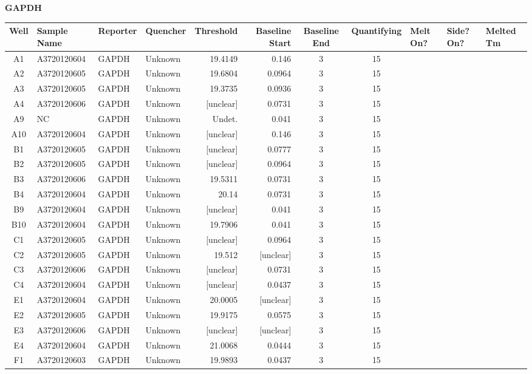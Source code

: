 \documentclass[UTF8,10pt,a4paper,fontset=fandol]{ctexart}
\begin{document}
\small
\begin{center}
\textbf{GAPDH}

\begin{tabular}{|c|p{2.0cm}|p{1.0cm}|p{1.0cm}|r|r|c|c|p{1.2cm}|p{1.0cm}|p{1.2cm}|}
\hline
\textbf{Well} & \textbf{Sample Name} & \textbf{Reporter} &
\textbf{Quencher} & \textbf{Threshold} & \textbf{Baseline Start} &
\textbf{Baseline End} & \textbf{Quantifying} & \textbf{Melt On?} &
\textbf{Side? On?} & \textbf{Melted Tm} \\
\hline
A1  & A3720120604 & GAPDH & Unknown & 19.4149 & 0.146  & 3  & 15 & & & \\
A2  & A3720120605 & GAPDH & Unknown & 19.6804 & 0.0964 & 3  & 15 & & & \\
A3  & A3720120605 & GAPDH & Unknown & 19.3735 & 0.0936 & 3  & 15 & & & \\
A4  & A3720120606 & GAPDH & Unknown & [unclear] & 0.0731 & 3  & 15 & & & \\
A9  & NC           & GAPDH & Unknown & Undet.   & 0.041  & 3  & 15 & & & \\
A10 & A3720120604 & GAPDH & Unknown & [unclear] & 0.146  & 3  & 15 & & & \\
B1  & A3720120605 & GAPDH & Unknown & [unclear] & 0.0777 & 3  & 15 & & & \\
B2  & A3720120605 & GAPDH & Unknown & [unclear] & 0.0964 & 3  & 15 & & & \\
B3  & A3720120606 & GAPDH & Unknown & 19.5311 & 0.0731 & 3  & 15 & & & \\
B4  & A3720120604 & GAPDH & Unknown & 20.14   & 0.0731 & 3  & 15 & & & \\
B9  & A3720120604 & GAPDH & Unknown & [unclear] & 0.041  & 3  & 15 & & & \\
B10 & A3720120604 & GAPDH & Unknown & 19.7906 & 0.041  & 3  & 15 & & & \\
C1  & A3720120605 & GAPDH & Unknown & [unclear] & 0.0964 & 3  & 15 & & & \\
C2  & A3720120605 & GAPDH & Unknown & 19.512  & [unclear] & 3  & 15 & & & \\
C3  & A3720120606 & GAPDH & Unknown & [unclear] & 0.0731 & 3  & 15 & & & \\
C4  & A3720120604 & GAPDH & Unknown & [unclear] & 0.0437 & 3  & 15 & & & \\
E1  & A3720120604 & GAPDH & Unknown & 20.0005 & [unclear] & 3  & 15 & & & \\
E2  & A3720120605 & GAPDH & Unknown & 19.9175 & 0.0575 & 3  & 15 & & & \\
E3  & A3720120606 & GAPDH & Unknown & [unclear] & [unclear] & 3  & 15 & & & \\
E4  & A3720120604 & GAPDH & Unknown & 21.0068 & 0.0444 & 3  & 15 & & & \\
F1  & A3720120603 & GAPDH & Unknown & 19.9893 & 0.0437 & 3  & 15 & & & \\
\hline
\end{tabular}
\end{center}
\end{document}
